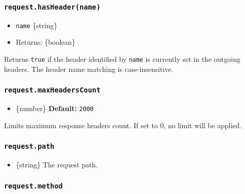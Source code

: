 \subsubsection{\texorpdfstring{\texttt{request.hasHeader(name)}}{request.hasHeader(name)}}\label{request.hasheadername}

\begin{itemize}
\tightlist
\item
  \texttt{name} \{string\}
\item
  Returns: \{boolean\}
\end{itemize}

Returns \texttt{true} if the header identified by \texttt{name} is
currently set in the outgoing headers. The header name matching is
case-insensitive.

\begin{Shaded}
\begin{Highlighting}[]
\OperatorTok{=}\NormalTok{(}\NormalTok{)}\OperatorTok{;}
\end{Highlighting}
\end{Shaded}

\subsubsection{\texorpdfstring{\texttt{request.maxHeadersCount}}{request.maxHeadersCount}}\label{request.maxheaderscount}

\begin{itemize}
\tightlist
\item
  \{number\} \textbf{Default:} \texttt{2000}
\end{itemize}

Limits maximum response headers count. If set to 0, no limit will be
applied.

\subsubsection{\texorpdfstring{\texttt{request.path}}{request.path}}\label{request.path}

\begin{itemize}
\tightlist
\item
  \{string\} The request path.
\end{itemize}

\subsubsection{\texorpdfstring{\texttt{request.method}}{request.method}}\label{request.method}

